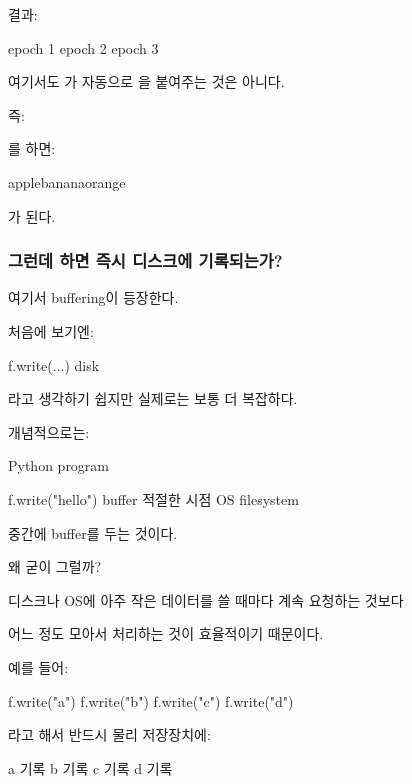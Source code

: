 결과:

\begin{dhkzsh}
epoch 1
epoch 2
epoch 3
\end{dhkzsh}

여기서도 가 자동으로 \zsh{\n}을 붙여주는 것은 아니다.

즉:

\begin{dhkcode}
\end{dhkcode}

를  하면:

\begin{dhkzsh}
applebananaorange
\end{dhkzsh}

가 된다.

\subsubsection{그런데 하면 즉시 디스크에 기록되는가?}

여기서 buffering이 등장한다.

처음에 보기엔:

\begin{dhksmry}[centered]
f.write(...)
\da
disk
\end{dhksmry}

라고 생각하기 쉽지만 실제로는 보통 더 복잡하다.

개념적으로는:

\begin{dhksmry}[centered]
Python program

f.write("hello")
\da
buffer
\da
적절한 시점
\da
OS
\da
filesystem
\end{dhksmry}

중간에 buffer를 두는 것이다.

왜 굳이 그럴까?

디스크나 OS에 아주 작은 데이터를 쓸 때마다 계속 요청하는 것보다

어느 정도 모아서 처리하는 것이 효율적이기 때문이다.

예를 들어:

\begin{dhkcode}
f.write("a")
f.write("b")
f.write("c")
f.write("d")
\end{dhkcode}

라고 해서 반드시 물리 저장장치에:

\begin{dhkzsh}
a 기록
b 기록
c 기록
d 기록
\end{dhkzsh}

